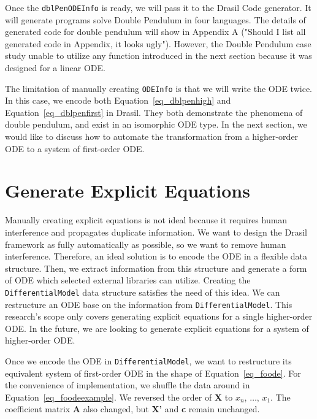 Once the \verb|dblPenODEInfo| is ready, we will pass it to the Drasil Code generator. It will generate programs solve Double Pendulum in four languages. The details of generated code for double pendulum will show in Appendix A ("Should I list all generated code in Appendix, it looks ugly"). However, the Double Pendulum case study unable to utilize any function introduced in the next section because it was designed for a linear ODE.

The limitation of manually creating \verb|ODEInfo| is that we will write the ODE twice. In this case, we encode both Equation~\ref{eq_dblpenhigh} and Equation~\ref{eq_dblpenfirst} in Drasil. They both demonstrate the phenomena of double pendulum, and exist in an isomorphic ODE type. In the next section, we would like to discuss how to automate the transformation from a higher-order ODE to a system of first-order ODE.

\section{Generate Explicit Equations}
Manually creating explicit equations is not ideal because it requires human interference and propagates duplicate information. We want to design the Drasil framework as fully automatically as possible, so we want to remove human interference. Therefore, an ideal solution is to encode the ODE in a flexible data structure. Then, we extract information from this structure and generate a form of ODE which selected external libraries can utilize. Creating the \verb|DifferentialModel| data structure satisfies the need of this idea. We can restructure an ODE base on the information from \verb|DifferentialModel|. This research's scope only covers generating explicit equations for a single higher-order ODE. In the future, we are looking to generate explicit equations for a system of higher-order ODE.

Once we encode the ODE in \verb|DifferentialModel|, we want to restructure its equivalent system of first-order ODE in the shape of Equation~\ref{eq_foode}. For the convenience of implementation, we shuffle the data around in Equation~\ref{eq_foodeexample}. We reversed the order of \textbf{X} to $x_{n}$, $\dots$, $x_{1}$. The coefficient matrix \textbf{A} also changed, but \textbf{X'} and \textbf{c} remain unchanged.

